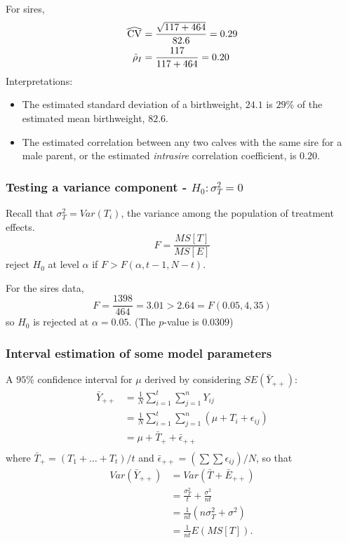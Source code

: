 For sires,
$$
\begin{aligned}
	\reallywidehat{CV} &= \frac{\sqrt{117 +464}}{82.6} = 0.29\\
	\hat{\rho}_I &= \frac{117}{117+464} = 0.20\\
\end{aligned}
$$
Interpretations:
\begin{itemize}
	\item The estimated standard deviation of a birthweight, $24.1$ is $29\%$ of the estimated mean birthweight, $82.6$.
	\item The estimated correlation between any two calves with the same sire for a male parent, or the estimated {\it intrasire} correlation coefficient, is $0.20$.
\end{itemize}

\subsubsection*{Testing a variance component - $H_0: \sigma_T^2 = 0$}
Recall that $\sigma_T^2 = \textit{Var}(T_i)$, the variance among the population of treatment effects.
$$
F = \frac{MS[T]}{MS[E]}
$$
reject $H_0$ at level $\alpha$ if $F>F(\alpha, t - 1, N - t)$.

For the sires data,
$$
F = \frac{1398}{464} = 3.01 > 2.64 = F(0.05, 4, 35)
$$
so $H_0$ is rejected at $\alpha = 0.05$. (The $p$-value is $0.0309$)

\subsubsection*{Interval estimation of some model parameters}
A $95\%$ confidence interval for $\mu$ derived by considering $SE(\bar{Y}_{++})$:
$$
\begin{aligned}
	\bar{Y}_{++} &= \frac{1}{N}\sum\limits_{i = 1}^t \sum\limits_{j = 1}^n Y_{ij}\\
	&= \frac{1}{N}\sum\limits_{i = 1}^t \sum\limits_{j = 1}^n (\mu + T_i + \epsilon_{ij})\\
	&= \mu + \bar{T}_{+} + \bar{\epsilon}_{++}\\
\end{aligned}
$$
where $\bar{T}_+ = (T_1 + \dots + T_t)/t$ and $\bar{\epsilon}_{++} = (\sum\sum\epsilon_{ij})/N$, so that
$$
\begin{aligned}
	\textit{Var}(\bar{Y}_{++}) &= \textit{Var}(\bar{T} + \bar{E}_{++})\\
	&= \frac{\sigma_T^2}{t} + \frac{\sigma^2}{nt}\\
	&= \frac{1}{nt} (n \sigma_T^2 + \sigma^2)\\
	&= \frac{1}{nt} \textit{E}(MS[T]).\\
\end{aligned}
$$

